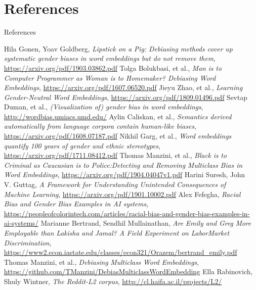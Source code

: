 \documentclass{beamer}
\begin{document}
	\section{References}
	\begin{frame}[allowframebreaks]{References}
		\small{
				\begin{thebibliography}{10}
				
				 Hila Gonen, Yoav Goldberg, \textit{Lipstick on a Pig: Debiasing methods cover up systematic gender biases in word embeddings but do not remove them}, \url{https://arxiv.org/pdf/1903.03862.pdf}
				 Tolga Bolukbasi, et al., \textit{Man is to Computer Programmer as Woman is to Homemaker? Debiasing Word Embeddings}, \url{https://arxiv.org/pdf/1607.06520.pdf}
				 Jieyu Zhao, et al., \textit{Learning Gender-Neutral Word Embeddings}, \url{https://arxiv.org/pdf/1809.01496.pdf}
				 Sevtap Duman, et al., \textit{(Visualization of) gender bias in word embeddings}, \url{http://wordbias.umiacs.umd.edu/}
				Aylin Caliskan, et al., \textit{Semantics derived automatically from language corpora contain human-like biases}, \url{https://arxiv.org/pdf/1608.07187.pdf}
				Nikhil Garg, et al., \textit{Word embeddings quantify 100 years of gender and ethnic stereotypes}, \url{https://arxiv.org/pdf/1711.08412.pdf}
				 Thomas Manzini, et al., \textit{Black is to Criminal as Caucasian is to Police:Detecting and Removing Multiclass Bias in Word Embeddings}, \url{https://arxiv.org/pdf/1904.04047v1.pdf}
				 Harini Suresh, John V. Guttag, \textit{A Framework for Understanding Unintended Consequences of Machine Learning}, \url{https://arxiv.org/pdf/1901.10002.pdf}
				 Alex Fefegha, \textit{Racial Bias and Gender Bias Examples in AI systems}, \url{https://peopleofcolorintech.com/articles/racial-bias-and-gender-bias-examples-in-ai-systems/}
				Marianne Bertrand, Sendhil Mullainathan, \textit{Are Emily and Greg More Employable than Lakisha and Jamal? A Field Experiment on LaborMarket Discrimination}, \url{https://www2.econ.iastate.edu/classes/econ321/Orazem/bertrand_emily.pdf}
				 Thomas Manzini, et al., \textit{Debiasing Multiclass Word Embeddings}, \url{https://github.com/TManzini/DebiasMulticlassWordEmbedding}
				Ella Rabinovich, Shuly Wintner, \textit{The Reddit-L2 corpus}, \url{http://cl.haifa.ac.il/projects/L2/}
				
			\end{thebibliography}
		}
		
	\end{frame}
	
\end{document}
